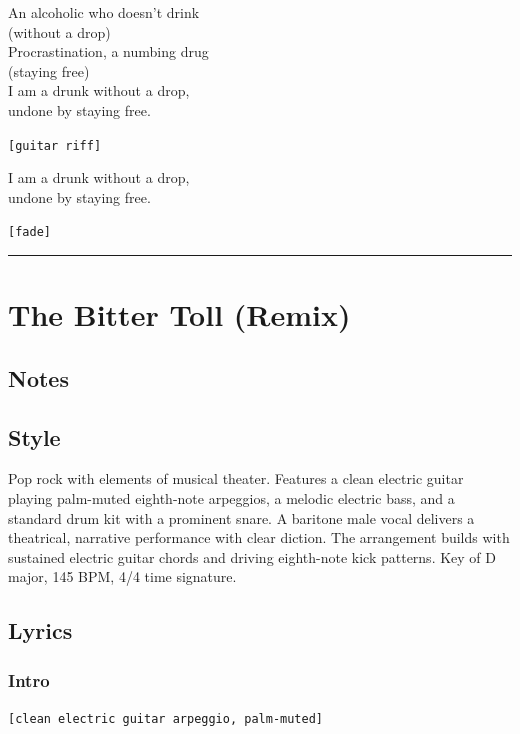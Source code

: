 \documentclass[]{article}
\begin{document}
An alcoholic who doesn't drink\\
(without a drop)\\
Procrastination, a numbing drug\\
(staying free)\\
I am a drunk without a drop,\\
undone by staying free.

\texttt{{[}guitar\ riff{]}}

I am a drunk without a drop,\\
undone by staying free.

\texttt{{[}fade{]}}

\begin{center}\rule{0.5\linewidth}{0.5pt}\end{center}

\section{The Bitter Toll (Remix)}\label{the-bitter-toll-remix}

\subsection{Notes}\label{notes-12}

\subsection{Style}\label{style-12}

Pop rock with elements of musical theater. Features a clean electric
guitar playing palm-muted eighth-note arpeggios, a melodic electric
bass, and a standard drum kit with a prominent snare. A baritone male
vocal delivers a theatrical, narrative performance with clear diction.
The arrangement builds with sustained electric guitar chords and driving
eighth-note kick patterns. Key of D major, 145 BPM, 4/4 time signature.

\subsection{Lyrics}\label{lyrics-12}

\subsubsection{Intro}\label{intro-4}

\texttt{{[}clean\ electric\ guitar\ arpeggio,\ palm-muted{]}}
\end{document}
